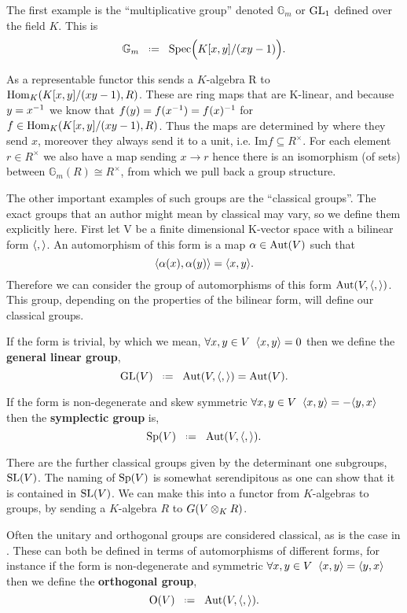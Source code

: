 \begin{example}[\(\mathbb{G}_m\)]
    The first example is the ``multiplicative group'' denoted \(\mathbb{G}_m\) or \(\operatorname{GL}_1\) defined over the field \(K\). This is 
    \[\mathbb{G}_m \defeq \Spec\Bigl( K[x,y]/(xy - 1)\Bigr).\]

    As a representable functor this sends a \(K\)-algebra R to \(\operatorname{Hom}_K(K[x,y]/(xy - 1), R)\). These are ring maps that are K-linear, and  because \(y = x^{-1}\) we know that \(f(y) = f(x^{-1}) = f(x)^{-1}\) for \(f\in \operatorname{Hom}_K(K[x,y]/(xy - 1), R)\). Thus the maps are determined by where they send \(x\), moreover they always send it to a unit, i.e. \(\mathrm{Im} f \subseteq R^\times\). For each element \(r\in R^\times\) we also have a map sending \(x\to r\) hence there is an isomorphism (of sets) between \(\mathbb{G}_m(R) \cong R^\times\), from which we pull back a group structure.
\end{example}

The other important examples of such groups are the ``classical groups''. The exact groups that an author might mean by classical may vary, so we define them explicitly here. First let V be a finite dimensional K-vector space with a bilinear form \(\langle ,\rangle\). An automorphism of this form is a map \(\alpha\in \operatorname{Aut}(V)\) such that 
\[\langle \alpha(x), \alpha(y)\rangle = \langle x,y\rangle.\]
Therefore we can consider the group of automorphisms of this form \(\operatorname{Aut}(V, \langle ,\rangle)\). This group, depending on the properties of the bilinear form, will define our classical groups. 

If the form is trivial, by which we mean, \(\forall x,y\in V \;\; \langle x, y\rangle = 0\) then we define the \textbf{general linear group},
\[\GL(V) \defeq \Aut(V, \inner{,}) = \Aut(V).\]

If the form is non-degenerate and skew symmetric \(\forall x,y\in V \;\; \langle x, y\rangle = -\langle y,x\rangle\) then the \textbf{symplectic group} is,
\[\Sp(V) \defeq \Aut(V, \inner{,}).\]

There are the further classical groups given by the determinant one subgroups, \(\operatorname{SL}(V)\). The naming of \(\operatorname{Sp}(V)\) is somewhat serendipitous as one can show that it is contained in \(\operatorname{SL}(V)\). We can make this into a functor from \(K\)-algebras to groups, by sending a \(K\)-algebra \(R\) to \(G(V\otimes_K R)\).

\begin{remark}
    Often the unitary and orthogonal groups are considered classical, as is the case in \cite{jiangPolesCertainResidual2013}. These can both be defined in terms of automorphisms of different forms, for instance if the form is non-degenerate and symmetric \(\forall x,y\in V \;\; \langle x, y\rangle = \langle y,x\rangle\) then we define the \textbf{orthogonal group},
    \[\mathrm{O}(V) \defeq \Aut(V, \inner{,}).\]
\end{remark}

